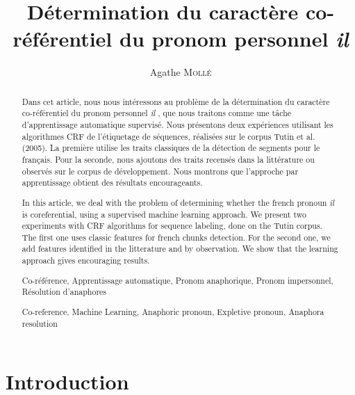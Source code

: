 \documentclass[a4paper,12pt]{article}
\title{Détermination du caractère co-référentiel du pronom personnel \og{}\textit{il}\fg{}}
\author{Agathe \textsc{Mollé}}
\begin{document}
\maketitle

\begin{abstract}
Dans cet article, nous nous intéressons au problème de la détermination du caractère co-référentiel du pronom personnel \og \textit{il} \fg{}, que nous traitons comme une tâche d'apprentissage automatique supervisé. Nous présentons deux expériences utilisant les algorithmes CRF de l'étiquetage de séquences, réalisées sur le corpus Tutin et al. (2005). La première utilise les traits classiques de la détection de segments pour le français. Pour la seconde, nous ajoutons des traits recensés dans la littérature ou observés sur le corpus de développement. Nous montrons que l'approche par apprentissage obtient des résultats encourageants.
\end{abstract}

\renewcommand\abstractname{Abstract}
\begin{abstract}
In this article, we deal with the problem of determining whether the french pronoun \og \textit{il} \fg{} is coreferential, using a supervised machine learning approach. We present two experiments with CRF algorithms for sequence labeling, done on the Tutin corpus. The first one uses classic features for french chunks detection. For the second one, we add features identified in the litterature and by observation. We show that the learning approach gives encouraging results.
\end{abstract}


\paragraph{}

\renewcommand\abstractname{Mots-clés}
\begin{abstract}
Co-référence, Apprentissage automatique, Pronom anaphorique, Pronom impersonnel, Résolution d'anaphores
\end{abstract}

\renewcommand\abstractname{Keywords}
\begin{abstract}
Co-reference, Machine Learning, Anaphoric pronoun, Expletive pronoun, Anaphora resolution
\end{abstract}

\section*{Introduction}
\end{document}
